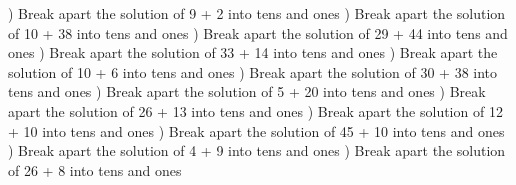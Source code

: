 \documentclass{article}%
\begin{document}
\newline%
\newline%
) Break apart the solution of 9 + 2 into tens and ones%
\newline%
\newline%
) Break apart the solution of 10 + 38 into tens and ones%
\newline%
\newline%
) Break apart the solution of 29 + 44 into tens and ones%
\newline%
\newline%
) Break apart the solution of 33 + 14 into tens and ones%
\newline%
\newline%
) Break apart the solution of 10 + 6 into tens and ones%
\newline%
\newline%
) Break apart the solution of 30 + 38 into tens and ones%
\newline%
\newline%
) Break apart the solution of 5 + 20 into tens and ones%
\newline%
\newline%
) Break apart the solution of 26 + 13 into tens and ones%
\newline%
\newline%
) Break apart the solution of 12 + 10 into tens and ones%
\newline%
\newline%
) Break apart the solution of 45 + 10 into tens and ones%
\newline%
\newline%
) Break apart the solution of 4 + 9 into tens and ones%
\newline%
\newline%
) Break apart the solution of 26 + 8 into tens and ones%
\newline%
\newline%
\end{document}
